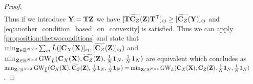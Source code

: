 \begin{proof}
\begin{equation}
\begin{split}
		\end{split}
	\end{equation}
	Thus if we introduce ${\mathbf{Y}} = {\mathbf{T}} {\mathbf{Z}}$ we have $[{\mathbf{T}} \widetilde{{\mathbf{C}}_{Z}}({\mathbf{Z}}) {\mathbf{T}}^\top]_{ij} \geq [\widetilde{{\mathbf{C}}_{Z}}({\mathbf{Y}})]_{ij}$ and \cref{eq:another_condition_based_on_convexity} is satisfied. Thus we can apply \cref{proposition:thetwoconditions} and state that $\min_{{\mathbf{Z}} \in \mathbb{R}^{N \times d}} \sum_{ij} \tilde{L}([{\mathbf{C}}_{X}({\mathbf{X}})]_{ij}, [\widetilde{{\mathbf{C}}_{Z}}({\mathbf{Z}})]_{ij})$ and $\min_{{\mathbf{Z}} \in \mathbb{R}^{N \times d}} \operatorname{GW}_{\tilde{L}}({\mathbf{C}}_{X}({\mathbf{X}}), \widetilde{{\mathbf{C}}_{Z}}({\mathbf{Z}}), \frac{1}{N}\mathbf{1}_N, \frac{1}{N}\mathbf{1}_N)$ are equivalent which concludes as $\min_{{\mathbf{Z}} \in \mathbb{R}^{N \times d}} \operatorname{GW}_{\tilde{L}}({\mathbf{C}}_{X}({\mathbf{X}}), \widetilde{{\mathbf{C}}_{Z}}({\mathbf{Z}}), \frac{1}{N}\mathbf{1}_N, \frac{1}{N}\mathbf{1}_N) = \min_{{\mathbf{Z}} \in \mathbb{R}^{N \times d}} \operatorname{GW}_{L}({\mathbf{C}}_{X}({\mathbf{X}}), {\mathbf{C}}_{Z}({\mathbf{Z}}), \frac{1}{N}\mathbf{1}_N, \frac{1}{N}\mathbf{1}_N)$.
\end{proof}

